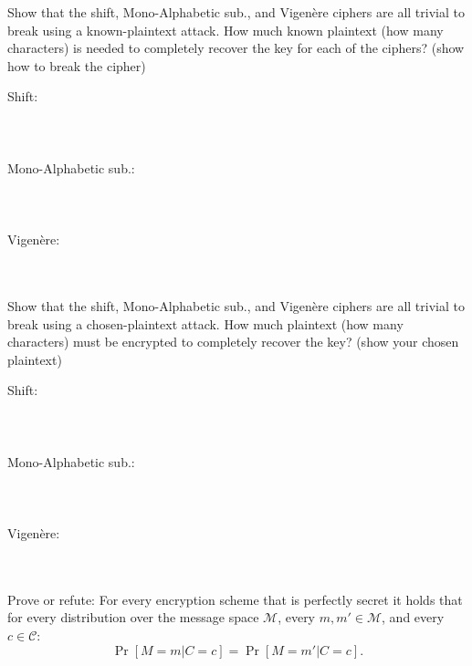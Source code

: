 \documentclass[12pt,letterpaper,boxed]{amspset}
\begin{document}


\begin{problem}[1.1]
Show that the shift, Mono-Alphabetic sub., and Vigen\`{e}re ciphers are all trivial to break using a known-plaintext attack. How much known plaintext (how many characters) is needed to completely recover the key for each of the ciphers?  (show how to break the cipher)
\end{problem}

\begin{solution}
Shift:\\
\\
\\
\\
Mono-Alphabetic sub.:\\
\\
\\
\\
Vigen\`{e}re: \\
\\
\\
\end{solution}

\begin{problem}[1.2]
Show that the shift, Mono-Alphabetic sub., and Vigen\`{e}re ciphers are all trivial to break using a chosen-plaintext attack. How much plaintext (how many characters) must be encrypted to completely recover the key? (show your chosen plaintext) 
\end{problem}

\begin{solution}
Shift:\\
\\
\\
\\
Mono-Alphabetic sub.:\\
\\
\\
\\
Vigen\`{e}re: \\
\\
\\
\end{solution}

\begin{problem}[2.1]
Prove or refute: For every encryption scheme that is perfectly secret it holds that for every distribution over the message space $\mathcal{M}$, every $m, m' \in \mathcal{M}$, and every $c \in \mathcal{C}$:
\[ \Pr[M=m | C=c] = \Pr[M=m'|C=c].
\]
\end{problem}
\end{document}
